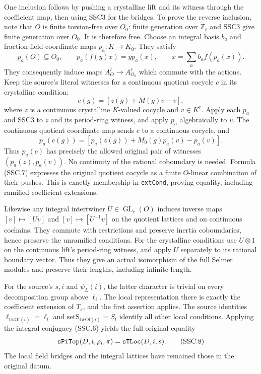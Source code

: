 \documentclass[11pt,a4paper]{article}
\numberwithin{equation}{section}
\theoremstyle{remark}\newtheorem{remark}[theorem]{Remark}
\begin{document}
One inclusion follows by pushing a crystalline lift and its witness
through the coefficient map, then using SSC3 for the bridges.
To prove the reverse inclusion, note that $O$ is finite
torsion-free over $O_0$: finite generation over $\mathbb Z_\ell$
and SSC3 give finite generation over $O_0$. It is therefore free.
Choose an integral basis $b_a$ and fraction-field coordinate maps
$p_a:K\to K_0$. They satisfy
\[
 p_a(O)\subseteq O_0,\qquad
 p_a(f(y)x)=y p_a(x),\qquad x=\sum_a b_a f(p_a(x)).              \tag{SSC.7}
\]
They consequently induce maps $A_O^r\to A_{O_0}^r$ which
commute with the actions. Keep the source's literal witnesses for a
continuous quotient cocycle $c$ in its crystalline condition:
\[
 c(g)=[z(g)+M(g)v-v],
\]
where $z$ is a continuous crystalline $K$-valued cocycle and
$v\in K^r$. Apply each $p_a$ and SSC3 to $z$ and its period-ring
witness, and apply $p_a$ algebraically to $v$. The continuous
quotient coordinate map sends $c$ to a continuous cocycle, and
\[
 p_a(c(g))=[p_a(z(g))+M_0(g)p_a(v)-p_a(v)].
\]
Thus $p_a(c)$ has precisely the allowed original pair of witnesses
$(p_a(z),p_a(v))$. No continuity of the rational coboundary is
needed. Formula (SSC.7)
expresses the original quotient cocycle as a finite $O$-linear
combination of their pushes. This is exactly membership in
\texttt{ext\allowbreak Cond}, proving equality, including ramified coefficient
extensions.

Likewise any integral intertwiner $U\in\operatorname{GL}_r(O)$
induces inverse maps $[v]\mapsto[Uv]$ and $[v]\mapsto[U^{-1}v]$
on the quotient lattices and on continuous cochains. They commute
with restrictions and preserve inertia coboundaries, hence preserve
the unramified conditions. For the crystalline conditions use
$U\otimes1$ on the continuous lift's period-ring witness, and
apply $U$ separately to its rational boundary vector. Thus they give an actual
isomorphism of the full Selmer modules and preserve their lengths,
including infinite length.

For the source's $s,i$ and $\psi_L(i)$, the latter character is
trivial on every decomposition group above $\ell_i$. The local
representation there is exactly the coefficient extension of
$T_s$, and the first assertion applies. The source identities
$\ell_{\mathrm{twOf}(i)}=\ell_i$ and
$\mathrm{setS}_{\mathrm{twOf}(i)}=S_i$ identify all other local
conditions. Applying the integral conjugacy (SSC.6) yields the
full original equality
\[
        \texttt{s\allowbreak Pi\allowbreak Top}(D,i,\rho_i,\pi)
             =\texttt{s\allowbreak TLoc}(D,i,s).                          \tag{SSC.8}
\]
The local field bridges and the integral lattices have remained
those in the original datum.
\end{document}
